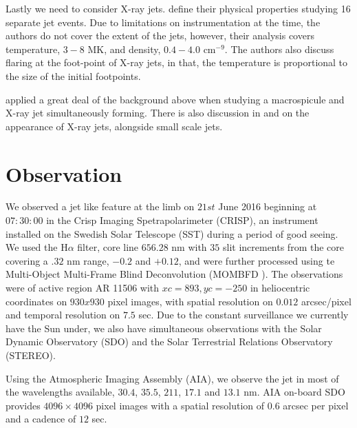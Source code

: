 \documentclass{emulateapj}
\begin{document}
Lastly we need to consider X-ray jets.
\cite{Shimojo2000} define their physical properties studying 16 separate jet events.
Due to limitations on instrumentation at the time, the authors do not cover the extent of the jets, however, their analysis covers temperature, $3 - 8$ MK, and density, $0.4 - 4.0$ cm$^{-9}$.
The authors also discuss flaring at the foot-point of X-ray jets, in that, the temperature is proportional to the size of the initial footpoints.

\cite{Kamio2010} applied a great deal of the background above when studying a macrospicule and X-ray jet simultaneously forming. There is also discussion in \cite{Pike_Harrison1997} and \cite{Kim2007} on the appearance of X-ray jets, alongside small scale jets.
 







\section{Observation}
We observed a jet like feature at the limb on $21st$ June 2016 beginning at $07:30:00$ in the Crisp Imaging Spetrapolarimeter (CRISP), an instrument installed on the Swedish Solar Telescope (SST) during a period of good seeing. %
We used the H$\alpha$ filter, core line $656.28$ nm with $35$ slit increments from the core covering a $.32$ nm range, $-0.2$ and $+0.12$, and were further processed using te Multi-Object Multi-Frame Blind Deconvolution (MOMBFD \cite{vanNoort2005}).
The observations were of active region AR 11506 with $xc = 893, yc = -250$ in heliocentric coordinates on $930x930$ pixel images, with spatial resolution on $0.012$ arcsec/pixel and temporal resolution on $7.5$ sec.
Due to the constant surveillance we currently have the Sun under, we also have simultaneous observations with the Solar Dynamic Observatory (SDO) and the Solar Terrestrial Relations Observatory (STEREO).

Using the Atmospheric Imaging Assembly (AIA), we observe the jet in most of the wavelengths available, $30.4$, $35.5$, $211$, $17.1$ and $13.1$ nm.
AIA on-board SDO \cite{AIAspec} provides $4096 \times 4096$ pixel images with a spatial resolution of $0.6$ arcsec per pixel and a cadence of $12$ sec.
\end{document}
